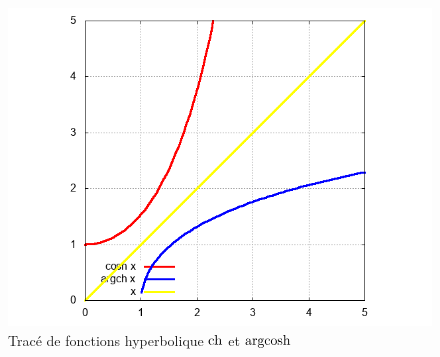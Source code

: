 %
\begin{figure}
  \centering
  \includegraphics[scale=0.4,angle=-90]{argcosh.png}
  \caption{Tracé de fonctions hyperbolique $\operatorname{ch}$ et $\operatorname{argcosh}$}
  \label{fig:tracecoshargcosh}
\end{figure}
%
